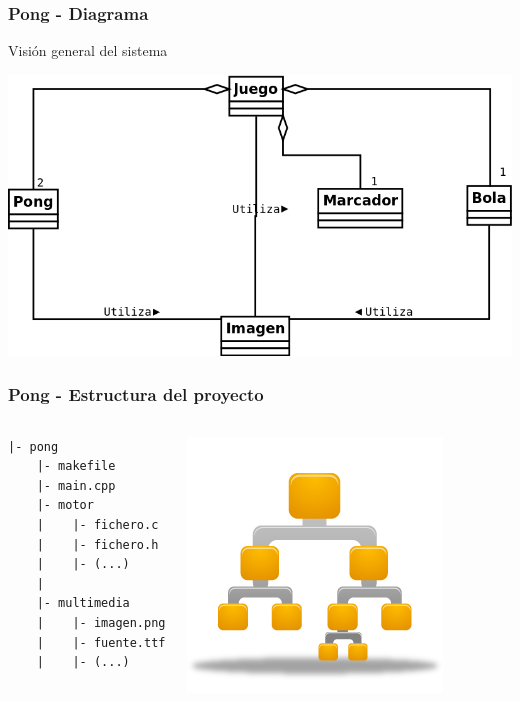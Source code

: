 \begin{frame}
	\frametitle{Pong - Diagrama}
	
    \begin{center}
        Visión general del sistema
    \end{center}
	
    \begin{center}
		\includegraphics[scale=0.25]{img/modulos.png}
	\end{center}	

\end{frame}

\begin{frame}[fragile]
	\frametitle{Pong - Estructura del proyecto}
    
    \begin{columns}[c]
	\column{175pt}

\begin{verbatim}
|- pong
    |- makefile
    |- main.cpp
    |- motor
    |    |- fichero.c
    |    |- fichero.h
    |    |- (...)
    |
    |- multimedia
    |    |- imagen.png
    |    |- fuente.ttf
    |    |- (...)
\end{verbatim}
	
	\column{125pt}
	\begin{center}
		\includegraphics[scale=0.4]{img/Binary-tree-256.png}
	\end{center}	
	
    \end{columns}

\end{frame}


